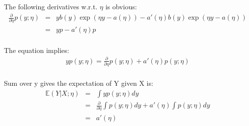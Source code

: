 \begin{answer}

The following derivatives w.r.t. $\eta$ is obvious:
\begin{eqnarray*}
\frac{\partial}{\partial \eta} p(y;\eta)
    &=& y b(y)\exp(\eta y -a(\eta)) - a'(\eta) b(y) \exp(\eta y - a(\eta)) \\
    &=& y p - a'(\eta) p \\
\end{eqnarray*}

The equation implies: 
\begin{eqnarray*}
    y p(y;\eta) =\frac{\partial}{\partial \eta} p(y;\eta) + a'(\eta) p(y;\eta) \\
\end{eqnarray*}

Sum over y gives the expectation of Y given X is:
\begin{eqnarray*}
\mathbb{E}(Y|X;\eta)
    &=& \int y p(y;\eta) dy \\
    &=& \frac{\partial}{\partial \eta}\int p(y;\eta)dy + a'(\eta)\int p(y;\eta)dy \\
    &=& a'(\eta)
\end{eqnarray*}
\end{answer}
